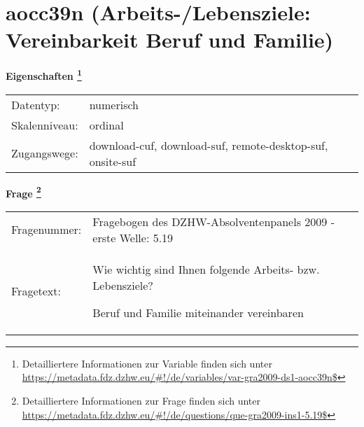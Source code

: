 
    \setcounter{footnote}{0}

    \vspace*{-1.8cm}
	\section{aocc39n (Arbeits-/Lebensziele: Vereinbarkeit Beruf und Familie)}
	\label{section:aocc39n}



    \vspace*{0.5cm}
    \noindent\textbf{Eigenschaften
	\footnote{Detailliertere Informationen zur Variable finden sich unter
		\url{https://metadata.fdz.dzhw.eu/\#!/de/variables/var-gra2009-ds1-aocc39n$}}}\\
	\begin{tabularx}{\hsize}{@{}lX}
	Datentyp: & numerisch \\
	Skalenniveau: & ordinal \\
	Zugangswege: &
	  download-cuf, 
	  download-suf, 
	  remote-desktop-suf, 
	  onsite-suf
 \\
    \end{tabularx}



				\vspace*{0.5cm}
                \noindent\textbf{Frage
	                \footnote{Detailliertere Informationen zur Frage finden sich unter
		              \url{https://metadata.fdz.dzhw.eu/\#!/de/questions/que-gra2009-ins1-5.19$}}}\\
				\begin{tabularx}{\hsize}{@{}lX}
					Fragenummer: &
					  Fragebogen des DZHW-Absolventenpanels 2009 - erste Welle:
					  5.19
 \\
					Fragetext: & Wie wichtig sind Ihnen folgende Arbeits- bzw. Lebensziele?\par  Beruf und Familie miteinander vereinbaren \\
				\end{tabularx}





